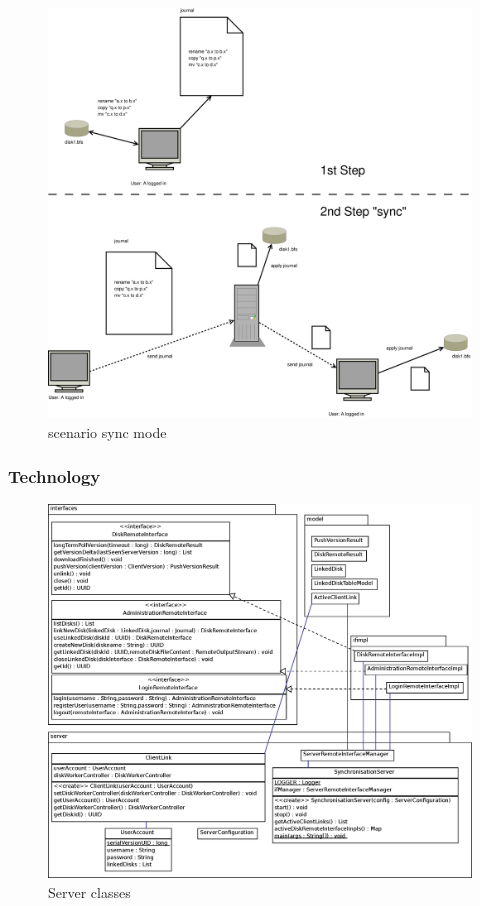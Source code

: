 \begin{figure}[h!]
\centering
\includegraphics[width=1\textwidth]{figures/22scenario_sync_mode.eps}
\caption{scenario sync mode}
\label{fig:22scenario_sync_mode}
\end{figure}

\subsubsection{Technology}

\begin{figure}[h!]
\centering
\includegraphics[width=1\textwidth]{figures/22Server.eps}
\caption{Server classes}
\label{fig:22server_classes}
\end{figure}


